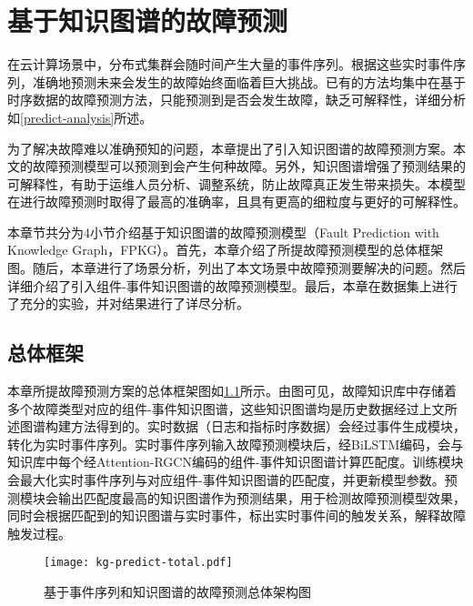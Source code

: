\chapter{基于知识图谱的故障预测}\label{chapter-predict-failure}
在云计算场景中，分布式集群会随时间产生大量的事件序列。根据这些实时事件序列，准确地预测未来会发生的故障始终面临着巨大挑战。已有的方法\cite{pitakrat2018hora,zhang2018prefix,baldoni2015line,xu2016health,cheng2018machine,du2017deeplog,das2018desh,islam2017predicting,cheng2018machine,du2017deeplog,das2018desh,gao2020task}均集中在基于时序数据的故障预测方法，只能预测到是否会发生故障，缺乏可解释性，详细分析如\ref{predict-analysis}所述。

为了解决故障难以准确预知的问题，本章提出了引入知识图谱的故障预测方案。本文的故障预测模型可以预测到会产生何种故障。另外，知识图谱增强了预测结果的可解释性，有助于运维人员分析、调整系统，防止故障真正发生带来损失。本模型在进行故障预测时取得了最高的准确率，且具有更高的细粒度与更好的可解释性。

本章节共分为4小节介绍基于知识图谱的故障预测模型（Fault Prediction with Knowledge Graph，FPKG）。首先，本章介绍了所提故障预测模型的总体框架图。随后，本章进行了场景分析，列出了本文场景中故障预测要解决的问题。然后详细介绍了引入组件-事件知识图谱的故障预测模型。最后，本章在数据集上进行了充分的实验，并对结果进行了详尽分析。
\section{总体框架}
本章所提故障预测方案的总体框架图如\ref{kg-predict-total}所示。由图可见，故障知识库中存储着多个故障类型对应的组件-事件知识图谱，这些知识图谱均是历史数据经过上文所述图谱构建方法得到的。实时数据（日志和指标时序数据）会经过事件生成模块，转化为实时事件序列。实时事件序列输入故障预测模块后，经BiLSTM编码，会与知识库中每个经Attention-RGCN编码的组件-事件知识图谱计算匹配度。训练模块会最大化实时事件序列与对应组件-事件知识图谱的匹配度，并更新模型参数。预测模块会输出匹配度最高的知识图谱作为预测结果，用于检测故障预测模型效果，同时会根据匹配到的知识图谱与实时事件，标出实时事件间的触发关系，解释故障触发过程。
\begin{figure}[htbp]
    \centering
    \texttt{[image: kg-predict-total.pdf]}
    \caption{基于事件序列和知识图谱的故障预测总体架构图\label{kg-predict-total}}
\end{figure}
